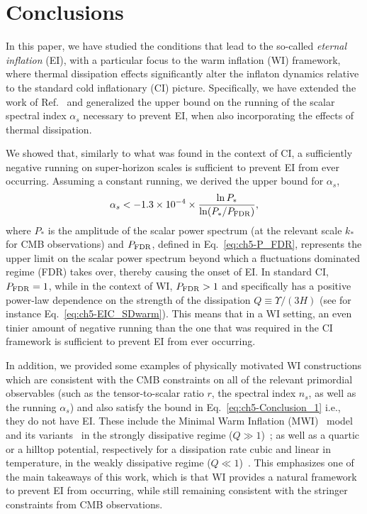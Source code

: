 \section{Conclusions}
\label{sec:ch5-conclusions}

In this paper, we have studied  the conditions that lead to the
so-called \textit{eternal inflation} (EI), with a particular focus to the
warm inflation (WI) framework, where thermal dissipation effects
significantly alter the inflaton dynamics relative to the standard
cold inflationary (CI) picture. Specifically, we have extended the work of
Ref.~\cite{Kinney:2014jya} and generalized the upper bound on the running of
the scalar spectral index $\alpha_s$ necessary to prevent EI, when also incorporating the effects of thermal dissipation.

We showed that, similarly to what was found in the context of CI, a
sufficiently negative running  on super-horizon scales is sufficient
to prevent EI from ever occurring.  Assuming a constant running, we
derived the upper bound for $\alpha_s$,
%
\begin{eqnarray}
    \alpha_s<- 1.3\times 10^{-4} \times \frac{\ln P_{*}}{
      \ln(P_{*}/P_{\rm{FDR}})}, \label{eq:ch5-Conclusion_1}
\end{eqnarray}
where $P_*$ is the amplitude of the scalar power spectrum (at the
relevant scale $k_*$ for CMB observations) and $P_{\rm{FDR}}$, defined in Eq.~\ref{eq:ch5-P_FDR}, represents the upper limit on the scalar power spectrum beyond which a
fluctuations dominated regime (FDR) takes over, thereby causing the
onset of EI. In standard CI, $P_{\rm{FDR}}=1$, while in the context of
WI, $P_{\rm{FDR}}>1$ and specifically has a positive power-law
dependence on the strength of the dissipation $Q\equiv \Upsilon/(3H)$
(see for instance Eq.~\ref{eq:ch5-EIC_SDwarm}). This means that in a WI setting, an even tinier amount of
negative running than the one that was required in the CI framework is sufficient to prevent EI from ever occurring.

In addition, we provided some examples of physically motivated WI
constructions which are consistent with the CMB constraints on all of
the relevant primordial observables (such as the tensor-to-scalar
ratio $r$, the spectral index $n_s$, as well as the running
$\alpha_s$) and also satisfy the bound in
Eq.~\ref{eq:ch5-Conclusion_1} i.e., they do not have EI. These include the Minimal Warm Inflation (MWI)~\cite{Berghaus:2019whh} model and its variants~\cite{Das:2020xmh} in the strongly dissipative regime ($Q\gg 1$)~\cite{Das:2022ubr}; as well as a quartic or a
hilltop potential, respectively for a dissipation rate cubic and linear in temperature, in the weakly dissipative regime ($Q\ll 1$)~\cite{Benetti:2016jhf}. This emphasizes one of the main takeaways
of this work, which is that WI provides a natural framework to prevent
EI from occurring, while still remaining consistent with the stringer
constraints from CMB observations.



